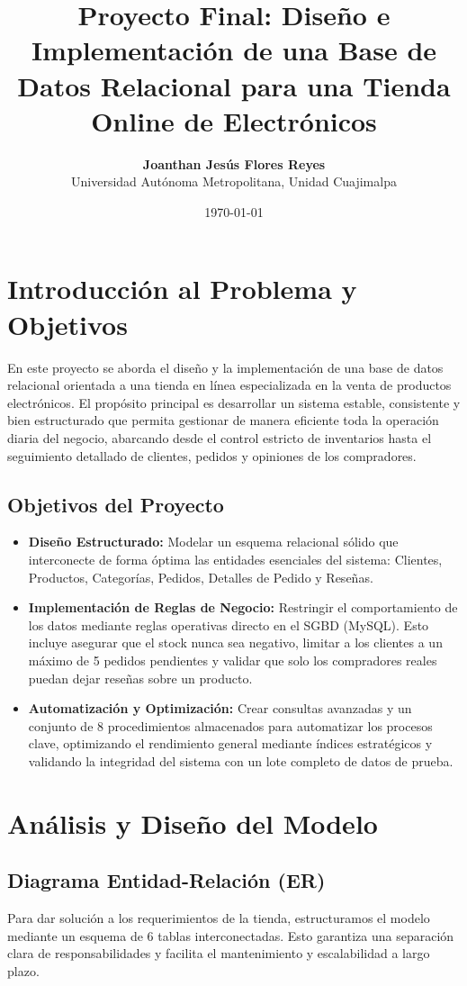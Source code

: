 \documentclass[11pt,a4paper]{article}
\title{\textbf{Proyecto Final: Diseño e Implementación de una Base de Datos Relacional para una Tienda Online de Electrónicos}}
\author{\textbf{Joanthan Jesús Flores Reyes} \\ Universidad Autónoma Metropolitana, Unidad Cuajimalpa}
\date{\today}
\begin{document}
\maketitle
\tableofcontents
\newpage

\section{Introducción al Problema y Objetivos}
En este proyecto se aborda el diseño y la implementación de una base de datos relacional orientada a una tienda en línea especializada en la venta de productos electrónicos. El propósito principal es desarrollar un sistema estable, consistente y bien estructurado que permita gestionar de manera eficiente toda la operación diaria del negocio, abarcando desde el control estricto de inventarios hasta el seguimiento detallado de clientes, pedidos y opiniones de los compradores.

\subsection{Objetivos del Proyecto}
\begin{itemize}[label=$\bullet$]
    \item \textbf{Diseño Estructurado:} Modelar un esquema relacional sólido que interconecte de forma óptima las entidades esenciales del sistema: Clientes, Productos, Categorías, Pedidos, Detalles de Pedido y Reseñas.
    \item \textbf{Implementación de Reglas de Negocio:} Restringir el comportamiento de los datos mediante reglas operativas directo en el SGBD (MySQL). Esto incluye asegurar que el stock nunca sea negativo, limitar a los clientes a un máximo de 5 pedidos pendientes y validar que solo los compradores reales puedan dejar reseñas sobre un producto.
    \item \textbf{Automatización y Optimización:} Crear consultas avanzadas y un conjunto de 8 procedimientos almacenados para automatizar los procesos clave, optimizando el rendimiento general mediante índices estratégicos y validando la integridad del sistema con un lote completo de datos de prueba.
\end{itemize}

\section{Análisis y Diseño del Modelo}

\subsection{Diagrama Entidad-Relación (ER)}
Para dar solución a los requerimientos de la tienda, estructuramos el modelo mediante un esquema de 6 tablas interconectadas. Esto garantiza una separación clara de responsabilidades y facilita el mantenimiento y escalabilidad a largo plazo.
\end{document}
